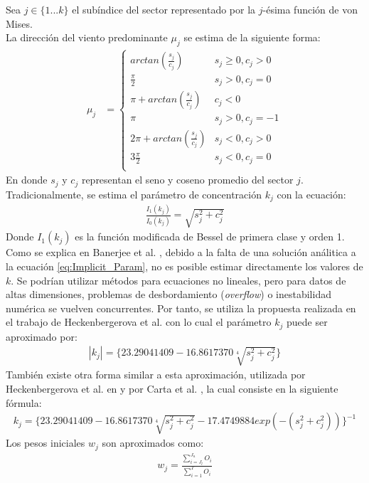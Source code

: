 Sea $j \in \{1 ... k\}$ el subíndice del sector representado por la $j$-ésima función de von Mises.\\
La dirección del viento predominante $\mu_j$ se estima de la siguiente forma:
\begin{align}\label{eq:Prevailing_Param}
    \mu_j &= 
        \left\{
            \begin{array}{ll}
                arctan(\frac{s_j}{c_j})  & s_j \geq 0, c_j > 0\\
                \frac{\pi}{2} & s_j > 0, c_j = 0\\
                \pi + arctan(\frac{s_j}{c_j}) & c_j < 0\\
                \pi & s_j > 0, c_j = -1\\
                2\pi + arctan(\frac{s_j}{c_j}) & s_j < 0, c_j > 0\\
                3\frac{\pi}{2} & s_j < 0, c_j = 0\\
            \end{array}
        \right.
\end{align}
En donde $s_j$ y $c_j$ representan el seno y coseno promedio del sector $j$.\\
Tradicionalmente, se estima el parámetro de concentración $k_j$ con la ecuación:
\begin{align}\label{eq:Implicit_Param}
    \frac{I_1(k_j)}{I_0(k_j)} = \sqrt{s_j^2 + c_j^2}
\end{align}
Donde $I_1(k_j)$ es la función modificada de Bessel de primera clase y orden 1.
 Como se explica en Banerjee et al. \cite{Banerjee05}, debido a la falta de una solución análitica a la ecuación \ref{eq:Implicit_Param}, no es posible estimar directamente los valores de $k$. Se podrían utilizar métodos para ecuaciones no lineales, pero para datos de altas dimensiones, problemas de desbordamiento (\emph{overflow}) o inestabilidad numérica se vuelven concurrentes. Por tanto, se utiliza la propuesta realizada en el trabajo de Heckenbergerova et al. \cite{Heckenbergerova15} con lo cual el parámetro $k_j$ puede ser aproximado por:\\
\begin{align}
    |k_j| = \{23.29041409 - 16.8617370\sqrt[4]{s_j^2 + c_j^2}\} 
\end{align}
También existe otra forma similar a esta aproximación, utilizada por  Heckenbergerova et al. en \cite{Heckenbergerova13} y por Carta et al. \cite{Carta07}, la cual consiste en 
la siguiente fórmula:\\
\begin{align}
    k_j = \{23.29041409 - 16.8617370\sqrt[4]{s_j^2 + c_j^2} - 17.4749884 exp(-(s_j^2 + c_j^2))\}^{-1} 
\end{align}
Los pesos iniciales $w_j$ son aproximados como: \\
\begin{align}\label{eq:Weight_Param}
    w_j = \frac{\sum_{i=J_l}^{J_u} O_i}{\sum_{i=1}^{T} O_i}
\end{align}

